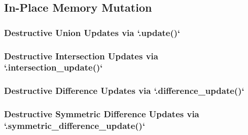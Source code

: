 \subsection{In-Place Memory Mutation}
\subsubsection{Destructive Union Updates via `.update()`}
\subsubsection{Destructive Intersection Updates via `.intersection_update()`}
\subsubsection{Destructive Difference Updates via `.difference_update()`}
\subsubsection{Destructive Symmetric Difference Updates via `.symmetric_difference_update()`}
